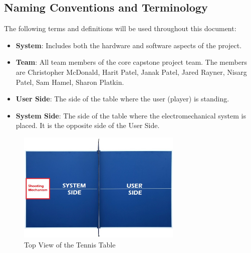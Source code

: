 \documentclass[11pt]{article}
\begin{document}
\subsection{Naming Conventions and Terminology}
The following terms and definitions will be used throughout this document:
\begin{itemize}
\item \textbf{System}: Includes both the hardware and software aspects of the project.
\item \textbf{Team}: All team members of the core capstone project team. The members are Christopher McDonald, Harit Patel, Janak Patel, Jared Rayner, Nisarg Patel, Sam Hamel, Sharon Platkin.
\item \textbf{User Side}: The side of the table where the user (player) is standing.
\item \textbf{System Side}: The side of the table where the electromechanical system is placed. It is the opposite side of the User Side.
\end{itemize}
\begin{figure}[htbp]
   \centering
   \includegraphics[width=0.7\textwidth]{../img/Table-Tennis-Top-View.png} %
   \caption{Top View of the Tennis Table}
   \label{fig:table-tennis-top-view}
\end{figure}
\end{document}
